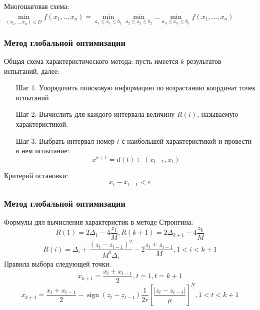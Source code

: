 \documentclass[aspectratio=1610]{beamer}
\DeclareMathOperator{\sign}{sign}
\begin{document}
\begin{frame}
\begin{columns}
\begin{column}{0.5\textwidth}
\begin{figure}[ht]
      \end{figure}
    \end{column}
  \end{columns}
  Многошаговая схема:
  \(\min\limits_{(x_1,..,x_n)\in D} f(x_1,..,x_n)=\min\limits_{a_1\leqslant x_1\leqslant b_1}\min\limits_{a_2\leqslant x_2\leqslant b_2}...\min\limits_{a_n\leqslant x_n\leqslant b_n} f(x_1,...,x_n)\)
\end{frame}

\begin{frame}
  \frametitle{Метод глобальной оптимизации}
  Общая схема характеристического метода:
  пусть имеется \(k\) результатов испытаний, далее:
  \begin{enumerate}
    \setlength{\itemindent}{.1in}
    \item[Шаг 1.] Упорядочить поисковую информацию по возрастанию
    координат точек испытаний
    \item[Шаг 2.] Вычислить для каждого интервала
    величину \(R(i)\), называемую характеристикой.
    \item[Шаг 3.] Выбрать интервал номер \(t\) с наибольшей
    характеристикой и провести в нем испытание:
    \begin{displaymath}
      x^{k+1}=d(t)\in (x_{t-1}, x_t)
    \end{displaymath}
  \end{enumerate}

  Критерий остановки:
  \begin{displaymath}
    x_t - x_{t-1} < \varepsilon
  \end{displaymath}
\end{frame}

\begin{frame}
  \frametitle{Метод глобальной оптимизации}
  Формулы дял вычисления характеристик в методе Стронгина:
  \begin{displaymath}
    R(1)=2\Delta_1-4\dfrac{z_1}{M},R(k+1)=2\Delta_{k+1}-4\dfrac{z_k}{M}
  \end{displaymath}
  \begin{displaymath}
    R(i)=\Delta_i+\dfrac{(z_i-z_{i-1})^2}{M^2\Delta_i}-2\dfrac{z_i+z_{i-1}}{M},1<i<k+1
  \end{displaymath}
  Правила выбора следующей точки:
  \begin{displaymath}
    x_{k+1}=\dfrac{x_{t}+x_{t-1}}{2},t=1,t=k+1
  \end{displaymath}
  \begin{displaymath}
    x_{k+1}=\dfrac{x_{t}+x_{t-1}}{2}-\sign(z_{t}-z_{t-1})\dfrac{1}{2r}\left[\dfrac{|z_{t}-z_{t-1}|}{\mu}\right]^N,1<t<k+1
  \end{displaymath}
\end{frame}
\end{document}
